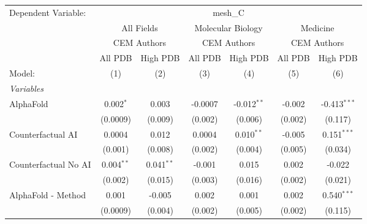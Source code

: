 \begingroup
\centering
\begin{tabular}{lcccccc}
   \tabularnewline \midrule \midrule
   Dependent Variable: & \multicolumn{6}{c}{mesh\_C}\\
 & \multicolumn{2}{c}{All Fields} & \multicolumn{2}{c}{Molecular Biology} & \multicolumn{2}{c}{Medicine} \\
\cmidrule(lr){2-3} \cmidrule(lr){4-5} \cmidrule(lr){6-7}
 & \multicolumn{2}{c}{CEM Authors} & \multicolumn{2}{c}{CEM Authors} & \multicolumn{2}{c}{CEM Authors} \\
\cmidrule(lr){2-3} \cmidrule(lr){4-5} \cmidrule(lr){6-7}
 & \multicolumn{1}{c}{All PDB} & \multicolumn{1}{c}{High PDB} & \multicolumn{1}{c}{All PDB} & \multicolumn{1}{c}{High PDB} & \multicolumn{1}{c}{All PDB} & \multicolumn{1}{c}{High PDB} \\
\cmidrule(lr){2-2} \cmidrule(lr){3-3} \cmidrule(lr){4-4} \cmidrule(lr){5-5} \cmidrule(lr){6-6} \cmidrule(lr){7-7}
   Model:                                                     & (1)          & (2)          & (3)     & (4)            & (5)     & (6)\\  
   \midrule
   \emph{Variables}\\
   AlphaFold                                                  & 0.002$^{*}$  & 0.003        & -0.0007 & -0.012$^{**}$  & -0.002  & -0.413$^{***}$\\   
                                                              & (0.0009)     & (0.009)      & (0.002) & (0.006)        & (0.002) & (0.117)\\   
   Counterfactual AI                                          & 0.0004       & 0.012        & 0.0004  & 0.010$^{**}$   & -0.005  & 0.151$^{***}$\\   
                                                              & (0.001)      & (0.008)      & (0.002) & (0.004)        & (0.005) & (0.034)\\   
   Counterfactual No AI                                       & 0.004$^{**}$ & 0.041$^{**}$ & -0.001  & 0.015          & 0.002   & -0.022\\   
                                                              & (0.002)      & (0.015)      & (0.003) & (0.016)        & (0.002) & (0.021)\\   
   AlphaFold - Method                                         & 0.001        & -0.005       & 0.002   & 0.001          & 0.002   & 0.540$^{***}$\\   
                                                              & (0.0009)     & (0.004)      & (0.002) & (0.005)        & (0.002) & (0.115)\\   

\end{tabular}
